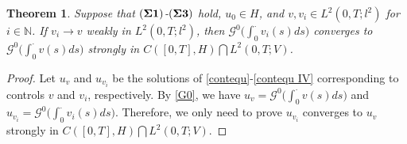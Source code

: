 \documentclass[10pt,a4paper]{amsart}
\newtheorem{theorem}{Theorem}
\begin{document}
 \begin{theorem} \label{h1}
    Suppose that $({\bf \Sigma 1})$-$({\bf \Sigma 3})$ hold,
    $u_0 \in H$, and
    $v, v_i \in L^2(0, T; l^2)$ for $i \in \mathbb{N}$.
    If $v_i \rightarrow v$ weakly in $L^2(0, T; l^2)$,
    then
    $\mathcal{G}^0 \big( \int_0^\cdot v_i(s) ds \big)$
    converges to
    $\mathcal{G}^0 \big( \int_0^\cdot v(s) ds \big)$
    strongly
    in  $C([0,T], H) \bigcap L^2(0,T; V)$.
 \end{theorem}

 \begin{proof}
    Let  $u_v$ and $u_{v_i}$
    be the solutions of \eqref{contequ}-\eqref{contequ IV} corresponding to
    controls $v$ and $v_i$, respectively.
    By \eqref{G0}, we   have
    $u_v = \mathcal{G}^0 \big( \int_0^\cdot v(s) ds \big)$
    and
    $u_{v_i} = \mathcal{G}^0 \big( \int_0^\cdot v_i(s) ds \big)$.
    Therefore, we only need to  prove $u_{v_i}$ converges to $u_v$ strongly in $C([0,T], H) \bigcap L^2(0,T; V)$.


\end{proof}
\end{document}
